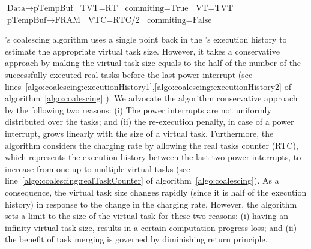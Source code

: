 \begin{algorithm}[t]
\begin{algorithmic}[1]
				\State {}
				\State $\text{Data} \rightarrow \text{pTempBuf}$ 
				\State $\text{TVT} = \text{RT}$ 
				\State $\text{commiting} = \text{True}$ \label{algo:coalescing:firmTransition2}
				\State 
				\State $\text{VT} = \text{TVT}$ \label{commitStage}
				\State $\text{pTempBuf} \rightarrow \text{FRAM}$ 
				\State $\text{VTC} = \text{RTC/2}$ 		 \label{algo:coalescing:executionHistory2}
				\State $\text{commiting} = \text{False}$ 

			\EndWhile

		\EndFunction




	
	\end{algorithmic}
\end{algorithm}

\sys's coalescing algorithm uses a single point back in the \sys's execution history to estimate the appropriate virtual task size. However, it takes a conservative approach by making the virtual task size equals to the half of the number of the successfully executed real tasks before the last power interrupt (see lines~\ref{algo:coalescing:executionHistory1},\ref{algo:coalescing:executionHistory2} of algorithm~\ref{algo:coalescing} ). We advocate the algorithm conservative approach by the following two reasons: (i) The power interrupts are not uniformly distributed over the tasks; and (ii) the re-execution penalty, in case of a power interrupt, grows linearly with the size of a virtual task. Furthermore, the algorithm considers the charging rate by allowing the real tasks counter (RTC), which represents the execution history between the last two power interrupts, to increase from one up to multiple virtual tasks (see line~\ref{algo:coalescing:realTaskCounter} of algorithm~\ref{algo:coalescing}). As a consequence, the virtual task size changes rapidly (since it is half of the execution history) in response to the change in the charging rate. However, the algorithm sets a limit to the size of the virtual task for these two reasons: (i) having an infinity virtual task size, results in a certain computation progress loss; and (ii) the benefit of task merging is governed by diminishing return principle.  

